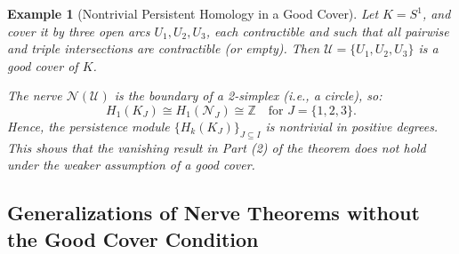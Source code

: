 \documentclass[12pt,a4paper,twoside, reqno, tbtags]{article}
\numberwithin{equation}{section}
\newtheorem{example}{Example}[section]
\begin{document}
\begin{example}[Nontrivial Persistent Homology in a Good Cover]
Let \( K = S^1 \), and cover it by three open arcs \( U_1, U_2, U_3 \), each contractible and such that all pairwise and triple intersections are contractible (or empty). Then \( \mathcal{U} = \{U_1, U_2, U_3\} \) is a good cover of \( K \).

The nerve \( \mathcal{N}(\mathcal{U}) \) is the boundary of a 2-simplex (i.e., a circle), so:
\[
H_1(K_J) \cong H_1(\mathcal{N}_J) \cong \mathbb{Z} \quad \text{for } J = \{1,2,3\}.
\]
Hence, the persistence module \( \{H_k(K_J)\}_{J \subseteq I} \) is \emph{nontrivial} in positive degrees. This shows that the vanishing result in Part (2) of the theorem does \emph{not} hold under the weaker assumption of a good cover.
\end{example}


\subsection{Generalizations of Nerve Theorems without the Good Cover Condition}
\end{document}

